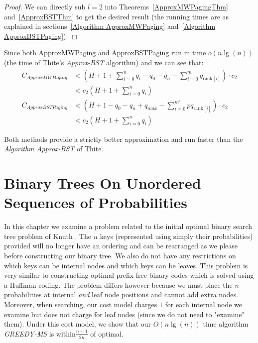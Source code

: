 \documentclass[letterpaper,12pt,titlepage,oneside,final]{book}
\theoremstyle{plain}
\begin{document}
\begin{proof}
We can directly sub $l=2$ into Theorems~\ref{ApproxMWPagingThm} and~\ref{ApproxBSTThm} to get the desired result (the running times are as explained in sections~\ref{Algorithm ApproxMWPaging} and~\ref{Algorithm ApproxBSTPaging}).
\end{proof}

Since both ApproxMWPaging and ApproxBSTPaging run in time $o(n\lg(n))$ (the time of Thite's \textit{Approx-BST} algorithm) and we can see that:\\
\begin{align*}
C_{ApproxMWPaging} &< (H + 1 + \sum_{i=0}^n q_i - q_0 - q_n - \sum_{i=0}^m q_{\text{rank}[i]}) \cdot  c_2 \\
&< c_2(H+1+\sum_{i=0}^{n}q_i) \\
 C_{ApproxBSTPaging} &< (H + 1 - q_0 - q_n + q_{max} - \sum_{i=0}^{m'} pq_{\text{rank}[i]})\cdot c_2 \\
 &< c_2(H+1+\sum_{i=0}^{n}q_i)
 \end{align*}

Both methods provide a strictly better approximation and run faster than the \textit{Algorithm Approx-BST} of Thite.

\chapter{Binary Trees On Unordered Sequences of Probabilities}\label{BST over Multisets}

In this chapter we examine a problem related to the initial optimal binary search tree problem of Knuth \cite{knuth1971optimum}. The $n$ keys (represented using simply their probabilities) provided will no longer have an ordering and can be rearranged as we please before constructing our binary tree. We also do not have any restrictions on which keys can be internal nodes and which keys can be leaves. This problem is very similar to constructing optimal prefix-free binary codes which is solved using a Huffman coding. The problem differs however because we must place the $n$ probabilities at internal \textit{and} leaf node positions and cannot add extra nodes. Moreover, when searching, our cost model charges $1$ for each internal node we examine but does not charge for leaf nodes (since we do not need to "examine" them). Under this cost model, we show that our $O(n \lg(n))$ time algorithm \textit{GREEDY-MS} is within$\frac{n+1}{2n}$ of optimal.
\end{document}
